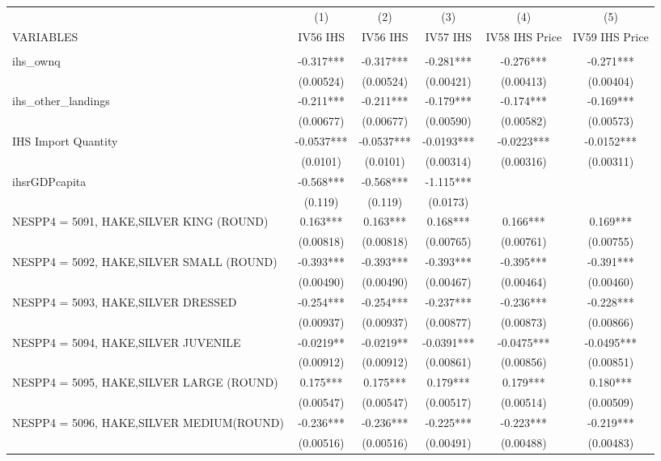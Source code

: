 \begin{tabular}{lccccc} \hline
 & (1) & (2) & (3) & (4) & (5) \\
VARIABLES & IV56 IHS & IV56 IHS & IV57 IHS & IV58 IHS Price & IV59 IHS Price \\ \hline
 &  &  &  &  &  \\
ihs\_ownq & -0.317*** & -0.317*** & -0.281*** & -0.276*** & -0.271*** \\
 & (0.00524) & (0.00524) & (0.00421) & (0.00413) & (0.00404) \\
ihs\_other\_landings & -0.211*** & -0.211*** & -0.179*** & -0.174*** & -0.169*** \\
 & (0.00677) & (0.00677) & (0.00590) & (0.00582) & (0.00573) \\
IHS Import Quantity & -0.0537*** & -0.0537*** & -0.0193*** & -0.0223*** & -0.0152*** \\
 & (0.0101) & (0.0101) & (0.00314) & (0.00316) & (0.00311) \\
ihsrGDPcapita & -0.568*** & -0.568*** & -1.115*** &  &  \\
 & (0.119) & (0.119) & (0.0173) &  &  \\
NESPP4 = 5091, HAKE,SILVER KING (ROUND) & 0.163*** & 0.163*** & 0.168*** & 0.166*** & 0.169*** \\
 & (0.00818) & (0.00818) & (0.00765) & (0.00761) & (0.00755) \\
NESPP4 = 5092, HAKE,SILVER SMALL (ROUND) & -0.393*** & -0.393*** & -0.393*** & -0.395*** & -0.391*** \\
 & (0.00490) & (0.00490) & (0.00467) & (0.00464) & (0.00460) \\
NESPP4 = 5093, HAKE,SILVER DRESSED & -0.254*** & -0.254*** & -0.237*** & -0.236*** & -0.228*** \\
 & (0.00937) & (0.00937) & (0.00877) & (0.00873) & (0.00866) \\
NESPP4 = 5094, HAKE,SILVER JUVENILE & -0.0219** & -0.0219** & -0.0391*** & -0.0475*** & -0.0495*** \\
 & (0.00912) & (0.00912) & (0.00861) & (0.00856) & (0.00851) \\
NESPP4 = 5095, HAKE,SILVER LARGE (ROUND) & 0.175*** & 0.175*** & 0.179*** & 0.179*** & 0.180*** \\
 & (0.00547) & (0.00547) & (0.00517) & (0.00514) & (0.00509) \\
NESPP4 = 5096, HAKE,SILVER MEDIUM(ROUND) & -0.236*** & -0.236*** & -0.225*** & -0.223*** & -0.219*** \\
 & (0.00516) & (0.00516) & (0.00491) & (0.00488) & (0.00483) \\

\end{tabular}
